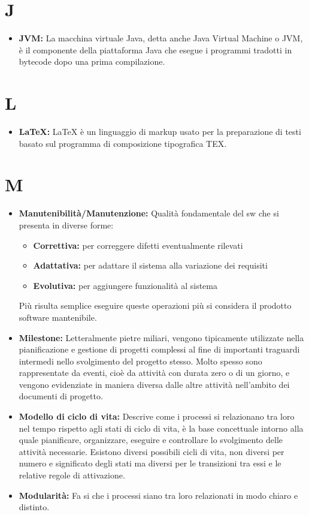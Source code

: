 \documentclass[a4paper]{article}
\begin{document}
	\section*{J}	
	\begin{itemize}
		\item \textbf{JVM:} La macchina virtuale Java, detta anche Java Virtual Machine o JVM, è il componente della piattaforma
		 Java che esegue i programmi tradotti in bytecode dopo una prima compilazione.
	\end{itemize}
	
	\section*{L}
	\begin{itemize}
		\item \textbf{LaTeX:} LaTeX  è un linguaggio di markup usato per la preparazione di testi basato sul programma di
		 composizione tipografica TEX.
	\end{itemize}
		
	\section*{M}
		\begin{itemize}
			\item \textbf{Manutenibilità/Manutenzione:} Qualità fondamentale del sw che si presenta in diverse forme:
			\begin{itemize}
				\item  \textbf{Correttiva:} per correggere difetti eventualmente rilevati
			  	\item  \textbf{Adattativa:} per adattare il sistema alla variazione dei requisiti
			  	\item  \textbf{Evolutiva:} per aggiungere funzionalità al sistema
			\end{itemize}
			Più risulta semplice eseguire queste operazioni più si considera il prodotto software mantenibile.
			\item \textbf{Milestone:} Letteralmente pietre miliari, vengono tipicamente utilizzate nella pianificazione 
			e gestione di progetti complessi al fine di importanti traguardi intermedi nello svolgimento del progetto stesso. 
			Molto spesso sono rappresentate da eventi, cioè da attività con durata zero o di un giorno, e vengono evidenziate 
			in maniera diversa dalle altre attività nell’ambito dei documenti di progetto.
			\item \textbf{Modello di ciclo di vita:} Descrive come i processi si relazionano tra loro nel tempo rispetto agli 
			stati di ciclo di vita, è la base concettuale intorno alla quale pianificare, organizzare, eseguire e controllare 
			lo svolgimento delle attività necessarie. Esistono diversi possibili cicli di vita, non diversi per numero e significato 
			degli stati ma diversi per le transizioni tra essi e le relative regole di attivazione.
			\item \textbf{Modularità:} Fa si che i processi siano tra loro relazionati in modo chiaro e distinto.		
		\end{itemize}
		
\end{document}
